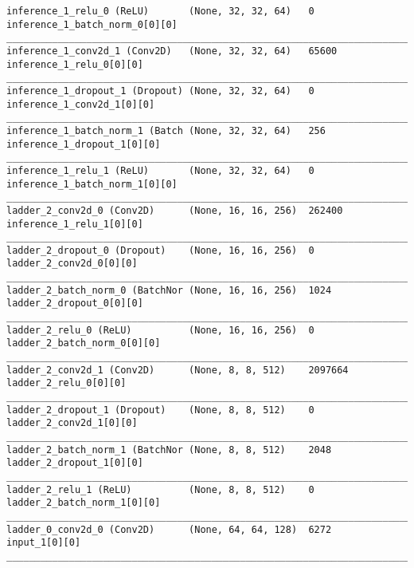 \begin{lstlisting}[caption={CelebA-\ac{VLAE} Encoder},captionpos=b,basicstyle=\tiny, label={lst:celeba-vlae-encoder}]
inference_1_relu_0 (ReLU)       (None, 32, 32, 64)   0           inference_1_batch_norm_0[0][0]
__________________________________________________________________________________________________
inference_1_conv2d_1 (Conv2D)   (None, 32, 32, 64)   65600       inference_1_relu_0[0][0]
__________________________________________________________________________________________________
inference_1_dropout_1 (Dropout) (None, 32, 32, 64)   0           inference_1_conv2d_1[0][0]
__________________________________________________________________________________________________
inference_1_batch_norm_1 (Batch (None, 32, 32, 64)   256         inference_1_dropout_1[0][0]
__________________________________________________________________________________________________
inference_1_relu_1 (ReLU)       (None, 32, 32, 64)   0           inference_1_batch_norm_1[0][0]
__________________________________________________________________________________________________
ladder_2_conv2d_0 (Conv2D)      (None, 16, 16, 256)  262400      inference_1_relu_1[0][0]
__________________________________________________________________________________________________
ladder_2_dropout_0 (Dropout)    (None, 16, 16, 256)  0           ladder_2_conv2d_0[0][0]
__________________________________________________________________________________________________
ladder_2_batch_norm_0 (BatchNor (None, 16, 16, 256)  1024        ladder_2_dropout_0[0][0]
__________________________________________________________________________________________________
ladder_2_relu_0 (ReLU)          (None, 16, 16, 256)  0           ladder_2_batch_norm_0[0][0]
__________________________________________________________________________________________________
ladder_2_conv2d_1 (Conv2D)      (None, 8, 8, 512)    2097664     ladder_2_relu_0[0][0]
__________________________________________________________________________________________________
ladder_2_dropout_1 (Dropout)    (None, 8, 8, 512)    0           ladder_2_conv2d_1[0][0]
__________________________________________________________________________________________________
ladder_2_batch_norm_1 (BatchNor (None, 8, 8, 512)    2048        ladder_2_dropout_1[0][0]
__________________________________________________________________________________________________
ladder_2_relu_1 (ReLU)          (None, 8, 8, 512)    0           ladder_2_batch_norm_1[0][0]
__________________________________________________________________________________________________
ladder_0_conv2d_0 (Conv2D)      (None, 64, 64, 128)  6272        input_1[0][0]
__________________________________________________________________________________________________

\end{lstlisting}
